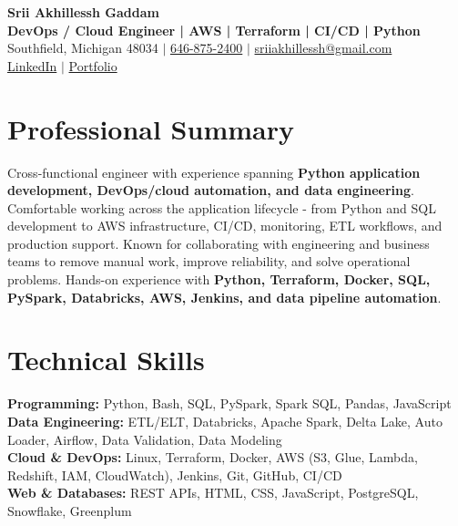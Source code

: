 \documentclass[letterpaper,10pt]{article}
\begin{document}
\fontsize{9.35pt}{10.45pt}\selectfont

\begin{center}
    {\LARGE \textbf{Srii Akhillessh Gaddam}} \\[-1pt]
    \textbf{DevOps / Cloud Engineer | AWS | Terraform | CI/CD | Python} \\[2pt]
    Southfield, Michigan 48034 $|$
    \href{tel:6468752400}{646-875-2400} $|$
    \href{mailto:sriiakhillessh@gmail.com}{sriiakhillessh@gmail.com} \\[1pt]
    \href{https://www.linkedin.com/in/srii-akhiilessh-gaddam-b48668191/}{LinkedIn} $|$
    \href{https://sriiakhillesshg.github.io/portfolio/}{Portfolio}
\end{center}
\vspace{-8pt}

\section{Professional Summary}
\small{Cross-functional engineer with experience spanning \textbf{Python application development, DevOps/cloud automation, and data engineering}. Comfortable working across the application lifecycle - from Python and SQL development to AWS infrastructure, CI/CD, monitoring, ETL workflows, and production support. Known for collaborating with engineering and business teams to remove manual work, improve reliability, and solve operational problems. Hands-on experience with \textbf{Python, Terraform, Docker, SQL, PySpark, Databricks, AWS, Jenkins, and data pipeline automation}.}

\section{Technical Skills}
\small{
\textbf{Programming:} Python, Bash, SQL, PySpark, Spark SQL, Pandas, JavaScript \\
\textbf{Data Engineering:} ETL/ELT, Databricks, Apache Spark, Delta Lake, Auto Loader, Airflow, Data Validation, Data Modeling \\
\textbf{Cloud \& DevOps:} Linux, Terraform, Docker, AWS (S3, Glue, Lambda, Redshift, IAM, CloudWatch), Jenkins, Git, GitHub, CI/CD \\
\textbf{Web \& Databases:} REST APIs, HTML, CSS, JavaScript, PostgreSQL, Snowflake, Greenplum
}
\end{document}
